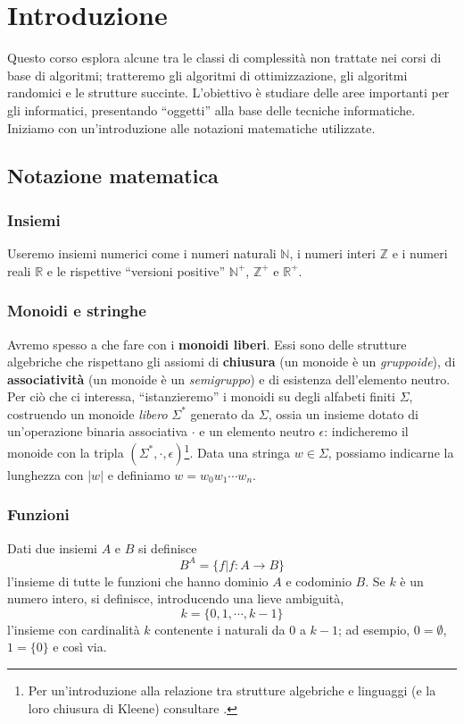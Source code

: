 \chapter{Introduzione}
Questo corso esplora alcune tra le classi di complessità non trattate nei corsi di base di algoritmi;
tratteremo gli algoritmi di ottimizzazione, gli algoritmi randomici e le strutture succinte.
L'obiettivo è studiare delle aree importanti per gli informatici, presentando ``oggetti'' alla base delle
tecniche informatiche. Iniziamo con un'introduzione alle notazioni matematiche utilizzate.

\section{Notazione matematica}
\subsection{Insiemi}
Useremo insiemi numerici come i numeri naturali $\mathbb{N}$,
i numeri interi $\mathbb{Z}$ e i numeri reali $\mathbb{R}$ e le rispettive
``versioni positive'' $\mathbb{N}^+$,  $\mathbb{Z}^+$ e $\mathbb{R}^+$.

\subsection{Monoidi e stringhe}
Avremo spesso a che fare con i {\bf monoidi liberi}. Essi sono delle strutture
algebriche che rispettano gli assiomi di {\bf chiusura} (un monoide è un \textit{gruppoide}),
di {\bf associatività} (un monoide è un \textit{semigruppo}) e di esistenza dell'elemento neutro.
Per ciò che ci interessa, ``istanzieremo'' i monoidi su degli alfabeti finiti $\Sigma$, costruendo
un monoide \textit{libero}\textit{} $\Sigma^*$ generato da $\Sigma$, ossia un insieme dotato
di un'operazione binaria associativa $\cdot$ e un elemento neutro $\epsilon$:
indicheremo il monoide con la tripla $(\Sigma^*, \cdot, \epsilon)$\footnote{
	Per un'introduzione alla relazione tra strutture algebriche e linguaggi (e la loro
	chiusura di Kleene) consultare \cite{Sakarovitch:09:automata}.}.
Data una stringa $w \in \Sigma$, possiamo indicarne la lunghezza con
$|w|$ e definiamo $w = w_0 w_1\cdots w_n$.

\subsection{Funzioni}
Dati due insiemi $A$ e $B$ si definisce
$$
	B^A = \{f | f: A \rightarrow B\}
$$
l'insieme di tutte le funzioni che hanno dominio $A$ e codominio $B$.
Se $k$ è un numero intero, si definisce, introducendo una lieve ambiguità,
$$
	k = \{0,1,\cdots,k-1\}
$$
l'insieme con cardinalità $k$ contenente i naturali da $0$ a $k-1$;
ad esempio, $0 = \emptyset$, $1 = \{0\}$ e così via.

